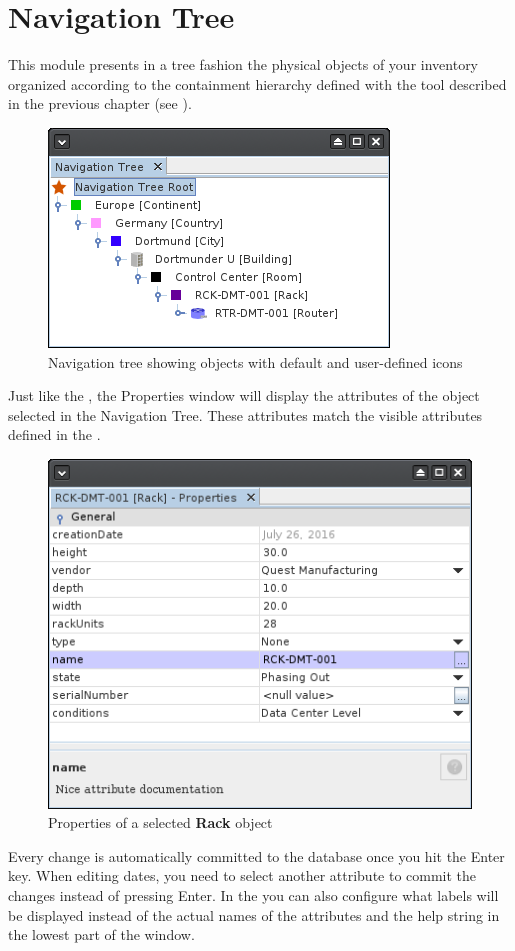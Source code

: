 \documentclass[a4paper]{article}
\begin{document}
	\section{Navigation Tree} \label{sec:navigation_tree}
	This module presents in a tree fashion the physical objects of your inventory organized according to the containment hierarchy defined with the tool described in the previous chapter (see \textbf{}).
	\begin{figure}[h!]
		\centering
		\includegraphics[width=0.4\linewidth]{img/navigation_tree.png}
		\caption{Navigation tree showing objects with default and user-defined icons}
		\label{fig:navigation_tree}
	\end{figure}
	Just like the , the Properties window will display the attributes of the object selected in the Navigation Tree. These attributes match the visible attributes defined in the \textbf{}.
	\begin{figure}[h!]
		\centering
		\includegraphics[width=0.5\linewidth]{img/navigation_tree_properties.png}
		\caption{Properties of a selected \textbf{Rack} object}
		\label{fig:navigation_tree_properties}
	\end{figure}
	Every change is automatically committed to the database once you hit the Enter key. When editing dates, you need to select another attribute to commit the changes instead of pressing Enter. In the \textbf{} you can also configure what labels will be displayed instead of the actual names of the attributes and the help string in the lowest part of the window.\newline
	
\end{document}

